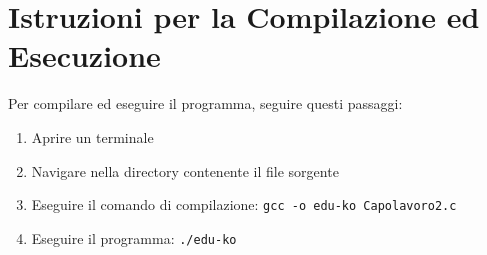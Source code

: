 \documentclass[a4paper,12pt]{article}
\begin{document}
\section{Istruzioni per la Compilazione ed Esecuzione}

Per compilare ed eseguire il programma, seguire questi passaggi:

\begin{enumerate}
    \item Aprire un terminale
    \item Navigare nella directory contenente il file sorgente
    \item Eseguire il comando di compilazione: \texttt{gcc -o edu-ko Capolavoro2.c}
    \item Eseguire il programma: \texttt{./edu-ko}
\end{enumerate}
\end{document}
